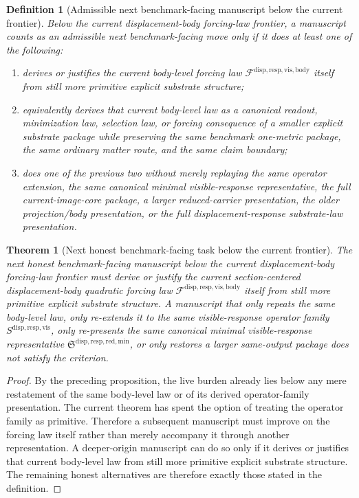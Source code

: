 \documentclass[11pt]{article}
\newcommand{\VisibleBodyForcingLaw}{\mathscr F^{\mathrm{disp,resp,vis,body}}}
\newcommand{\VisibleResponseOperator}{S^{\mathrm{disp,resp,vis}}}
\newcommand{\MinimalReducedStructure}{\mathfrak S^{\mathrm{disp,resp,red,min}}}
\newtheorem{definition}{Definition}
\newtheorem{theorem}{Theorem}
\begin{document}
\begin{definition}[Admissible next benchmark-facing manuscript below the current frontier]
Below the current displacement-body forcing-law frontier, a manuscript counts as an admissible next benchmark-facing move only if it does at least one of the following:
\begin{enumerate}
    \item derives or justifies the current body-level forcing law \(\VisibleBodyForcingLaw\) itself from still more primitive explicit substrate structure;
    \item equivalently derives that current body-level law as a canonical readout, minimization law, selection law, or forcing consequence of a smaller explicit substrate package while preserving the same benchmark one-metric package, the same ordinary matter route, and the same claim boundary;
    \item does one of the previous two without merely replaying the same operator extension, the same canonical minimal visible-response representative, the full current-image-core package, a larger reduced-carrier presentation, the older projection/body presentation, or the full displacement-response substrate-law presentation.
\end{enumerate}
\end{definition}

\begin{theorem}[Next honest benchmark-facing task below the current frontier]
The next honest benchmark-facing manuscript below the current displacement-body forcing-law frontier must derive or justify the current section-centered displacement-body quadratic forcing law \(\VisibleBodyForcingLaw\) itself from still more primitive explicit substrate structure. A manuscript that only repeats the same body-level law, only re-extends it to the same visible-response operator family \(\VisibleResponseOperator\), only re-presents the same canonical minimal visible-response representative \(\MinimalReducedStructure\), or only restores a larger same-output package does not satisfy the criterion.
\end{theorem}

\begin{proof}
By the preceding proposition, the live burden already lies below any mere restatement of the same body-level law or of its derived operator-family presentation. The current theorem has spent the option of treating the operator family as primitive. Therefore a subsequent manuscript must improve on the forcing law itself rather than merely accompany it through another representation. A deeper-origin manuscript can do so only if it derives or justifies that current body-level law from still more primitive explicit substrate structure. The remaining honest alternatives are therefore exactly those stated in the definition.
\end{proof}
\end{document}
